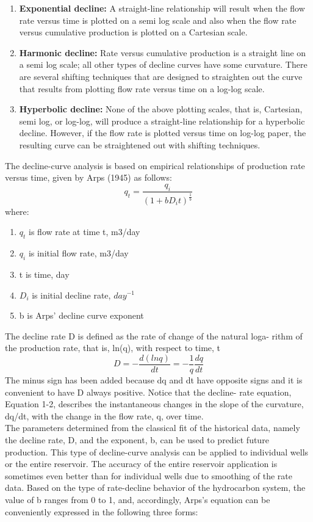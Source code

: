 \documentclass[12pt,a4paper]{report}
\begin{document}
\begin{enumerate}
	\item \textbf{Exponential decline:}
	 A straight-line relationship will result when the flow rate versus time is plotted on a semi log scale and also when the flow rate versus cumulative production is plotted on a Cartesian scale.
	\item \textbf{Harmonic decline:}
	Rate versus cumulative production is a straight
	line on a semi log scale; all other types of decline curves have some curvature. There are several shifting techniques that are designed to straighten out the curve that results from plotting flow rate versus time on a log-log scale.
	\item \textbf{Hyperbolic decline:}
	None of the above plotting scales, that is, Cartesian, semi log, or log-log, will produce a straight-line relationship for a hyperbolic decline. However, if the flow rate is plotted versus time on log-log paper, the resulting curve can be straightened out with shifting techniques.
\end{enumerate}
The decline-curve analysis is based on empirical relationships of production rate versus time, given by Arps (1945) as follows:
\begin{equation}
q_{t} = \frac{q_{i}}{(1+bD_{i}t)^{\frac{1}{b}}}
\end{equation}
where:
\begin{enumerate}
	\item[] $q_{t}$ is flow rate at time t, m3/day
	\item[] $q_{i}$ is initial flow rate, m3/day
	\item[] t is time, day
	\item[] $D_{i}$ is initial decline rate, $day^{-1}$
	\item[] b is Arps' decline curve exponent
\end{enumerate}
The decline rate D is defined as the rate of change of the natural loga- rithm of the production rate, that is, ln(q), with respect to time, t
\begin{equation}
D = -\frac{d(lnq)}{dt} = -\frac{1}{q}\frac{dq}{dt}
\end{equation}
The minus sign has been added because dq and dt have opposite signs and it is convenient to have D always positive. Notice that the decline- rate equation, Equation 1-2, describes the instantaneous changes in the slope of the curvature, dq/dt, with the change in the flow rate, q, over time.\\
The parameters determined from the classical fit of the historical data, namely the decline rate, D, and the exponent, b, can be used to predict future production. This type of decline-curve analysis can be applied to individual wells or the entire reservoir. The accuracy of the entire reservoir application is sometimes even better than for individual wells due to smoothing of the rate data. Based on the type of rate-decline behavior of the hydrocarbon system, the value of b ranges from 0 to 1, and, accordingly, Arps’s equation can be conveniently expressed in the following three forms:
\end{document}
